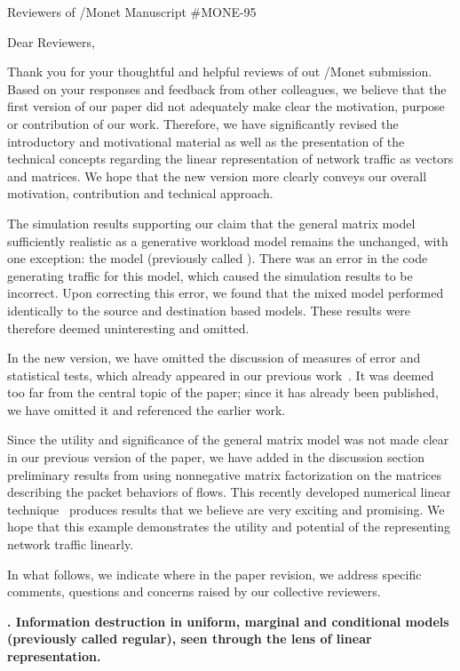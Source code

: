\documentclass{letter}
\newcounter{topic}
\newcommand{\topic}[1]{
\addtocounter{topic}{1}
\textbf{\arabic{topic}. #1}
}
\begin{document}
\begin{letter}{Reviewers of /Monet Manuscript \#MONE-95}

\opening{Dear Reviewers,}

Thank you for your thoughtful and helpful reviews of out /Monet submission.
Based on your responses and feedback from other colleagues, we believe that the first version of our paper did not adequately make clear the motivation, purpose or contribution of our work.
Therefore, we have significantly revised the introductory and motivational material as well as the presentation of the technical concepts regarding the linear representation of network traffic as vectors and matrices.
We hope that the new version more clearly conveys our overall motivation, contribution and technical approach.

The simulation results supporting our claim that the general matrix model sufficiently realistic as a generative workload model remains the unchanged, with one exception:
the  model (previously called ).
There was an error in the code generating traffic for this model, which caused the simulation results to be incorrect.
Upon correcting this error, we found that the mixed model performed identically to the source and destination based models.
These results were therefore deemed uninteresting and omitted.

In the new version, we have omitted the discussion of measures of error and statistical tests, which already appeared in our previous work~\cite{Karpinski07:cbr-failure}. It was deemed too far from the central topic of the paper; since it has already been published, we have omitted it and referenced the earlier work.

Since the utility and significance of the general matrix model was not made clear in our previous version of the paper, we have added in the discussion section preliminary results from using nonnegative matrix factorization on the  matrices describing the packet behaviors of flows. This recently developed numerical linear technique~\cite{Lee01} produces results that we believe are very exciting and promising.
We hope that this example demonstrates the utility and potential of the representing network traffic linearly.

In what follows, we indicate where in the paper revision, we address specific comments, questions and concerns raised by our collective reviewers.

\topic{Information destruction in uniform, marginal and conditional models (previously called regular), seen through the lens of linear representation.}


\end{letter}
\end{document}
